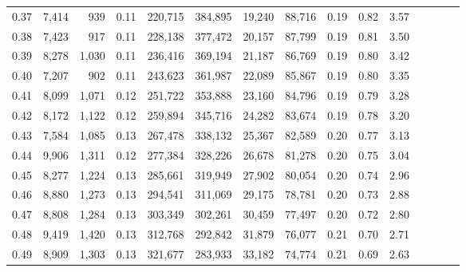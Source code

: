 \begin{tabular}{rrrcrrrrrrrrrrr}
0.37 &   7,414 &    939 &                                       0.11 &  220,715 &  384,895 &   19,240 &   88,716 &  0.19 &  0.82 &                         3.57 \\
0.38 &   7,423 &    917 &                                       0.11 &  228,138 &  377,472 &   20,157 &   87,799 &  0.19 &  0.81 &                         3.50 \\
0.39 &   8,278 &  1,030 &                                       0.11 &  236,416 &  369,194 &   21,187 &   86,769 &  0.19 &  0.80 &                         3.42 \\
0.40 &   7,207 &    902 &                                       0.11 &  243,623 &  361,987 &   22,089 &   85,867 &  0.19 &  0.80 &                         3.35 \\
0.41 &   8,099 &  1,071 &                                       0.12 &  251,722 &  353,888 &   23,160 &   84,796 &  0.19 &  0.79 &                         3.28 \\
0.42 &   8,172 &  1,122 &                                       0.12 &  259,894 &  345,716 &   24,282 &   83,674 &  0.19 &  0.78 &                         3.20 \\
0.43 &   7,584 &  1,085 &                                       0.13 &  267,478 &  338,132 &   25,367 &   82,589 &  0.20 &  0.77 &                         3.13 \\
0.44 &   9,906 &  1,311 &                                       0.12 &  277,384 &  328,226 &   26,678 &   81,278 &  0.20 &  0.75 &                         3.04 \\
0.45 &   8,277 &  1,224 &                                       0.13 &  285,661 &  319,949 &   27,902 &   80,054 &  0.20 &  0.74 &                         2.96 \\
0.46 &   8,880 &  1,273 &                                       0.13 &  294,541 &  311,069 &   29,175 &   78,781 &  0.20 &  0.73 &                         2.88 \\
0.47 &   8,808 &  1,284 &                                       0.13 &  303,349 &  302,261 &   30,459 &   77,497 &  0.20 &  0.72 &                         2.80 \\
0.48 &   9,419 &  1,420 &                                       0.13 &  312,768 &  292,842 &   31,879 &   76,077 &  0.21 &  0.70 &                         2.71 \\
0.49 &   8,909 &  1,303 &                                       0.13 &  321,677 &  283,933 &   33,182 &   74,774 &  0.21 &  0.69 &                         2.63 \\

\end{tabular}

